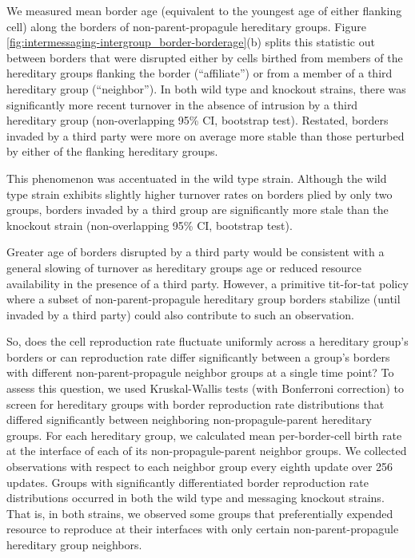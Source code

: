We measured mean border age (equivalent to the youngest age of either flanking cell) along the borders of non-parent-propagule hereditary groups.
Figure \ref{fig:intermessaging-intergroup_border-borderage}(b) splits this statistic out between borders that were disrupted either by cells birthed from members of the hereditary groups flanking the border (``affiliate'') or from a member of a third hereditary group (``neighbor'').
In both wild type and knockout strains, there was significantly more recent turnover in the absence of intrusion by a third hereditary group (non-overlapping 95\% CI, bootstrap test).
Restated, borders invaded by a third party were more on average more stable than those perturbed by either of the flanking hereditary groups.

This phenomenon was accentuated in the wild type strain.
Although the wild type strain exhibits slightly higher turnover rates on borders plied by only two groups, borders invaded by a third group are significantly more stale than the knockout strain (non-overlapping 95\% CI, bootstrap test).

Greater age of borders disrupted by a third party would be consistent with a general slowing of turnover as hereditary groups age or reduced resource availability in the presence of a third party.
However, a primitive tit-for-tat policy where a subset of non-parent-propagule hereditary group borders stabilize (until invaded by a third party) could also contribute to such an observation.

So, does the cell reproduction rate fluctuate uniformly across a hereditary group's borders or can reproduction rate differ significantly between a group's borders with different non-parent-propagule neighbor groups at a single time point?
To assess this question, we used Kruskal-Wallis tests (with Bonferroni correction) to screen for hereditary groups with border reproduction rate distributions that differed significantly between neighboring non-propagule-parent hereditary groups.
For each hereditary group, we calculated mean per-border-cell birth rate at the interface of each of its non-propagule-parent neighbor groups.
We collected observations with respect to each neighbor group every eighth update over 256 updates.
Groups with significantly differentiated border reproduction rate distributions occurred in both the wild type and messaging knockout strains.
That is, in both strains, we observed some groups that preferentially expended resource to reproduce at their interfaces with only certain non-parent-propagule hereditary group neighbors.

